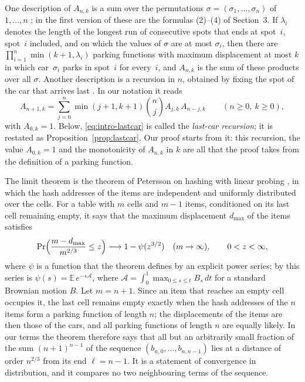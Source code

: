 \documentclass{amsart}
\theoremstyle{definition}
\theoremstyle{remark}
\numberwithin{equation}{section}
\begin{document}
One description of $A_{n,k}$ is a sum over the permutations $\sigma=(\sigma_1,\dots,\sigma_n)$ of $1,\dots,n$ \cite[Section~4.1, (6)--(8)]{celano2025}; in the first version of \cite{celano2025} these are the formulas (2)--(4) of Section~3. If $\lambda_i$ denotes the length of the longest run of consecutive spots that ends at spot~$i$, spot~$i$ included, and on which the values of $\sigma$ are at most $\sigma_i$, then there are $\prod_{i=1}^{n}\min(k+1,\lambda_i)$ parking functions with maximum displacement at most $k$ in which car~$\sigma_i$ parks in spot~$i$ for every~$i$, and $A_{n,k}$ is the sum of these products over all $\sigma$. Another description is a recursion in $n$, obtained by fixing the spot of the car that arrives last \cite[Theorem~3.7]{aguilarfraga2024}. In our notation it reads
\begin{equation}\label{eq:intro-lastcar}
A_{n+1,k}=\sum_{j=0}^{n}\min(j+1,k+1)\binom{n}{j}A_{j,k}\,A_{n-j,k}\qquad(n\ge 0,\ k\ge 0),
\end{equation}
with $A_{0,k}=1$. Below, \eqref{eq:intro-lastcar} is called the \emph{last-car recursion}; it is restated as Proposition~\ref{prop:lastcar}. Our proof starts from it: this recursion, the value $A_{0,k}=1$ and the monotonicity of $A_{n,k}$ in $k$ are all that the proof takes from the definition of a parking function.

The limit theorem is the theorem of Petersson on hashing with linear probing \cite[Theorem~2.1]{petersson2009}, in which the hash addresses of the items are independent and uniformly distributed over the cells. For a table with $m$ cells and $m-1$ items, conditioned on its last cell remaining empty, it says that the maximum displacement $d_{\max}$ of the items satisfies
\[
\Pr\Bigl(\frac{m-d_{\max}}{m^{2/3}}\le z\Bigr)\longrightarrow 1-\psi(z^{3/2})\quad(m\to\infty),\qquad 0<z<\infty,
\]
where $\psi$ is a function that the theorem defines by an explicit power series; by \cite[Corollary~2.4]{jansonpetersson2009} this series is $\psi(s)=\mathbb{E}\,e^{-s\mathcal{A}}$, where $\mathcal{A}=\int_0^1\max_{0\le s\le t}B_s\,dt$ for a standard Brownian motion $B$. Let $m=n+1$. Since an item that reaches an empty cell occupies it, the last cell remains empty exactly when the hash addresses of the $n$ items form a parking function of length $n$; the displacements of the items are then those of the cars, and all parking functions of length $n$ are equally likely. In our terms the theorem therefore says that all but an arbitrarily small fraction of the sum $(n+1)^{n-1}$ of the sequence $(b_{n,0},\dots,b_{n,n-1})$ lies at a distance of order $n^{2/3}$ from its end $\ell=n-1$. It is a statement of convergence in distribution, and it compares no two neighbouring terms of the sequence.
\end{document}
